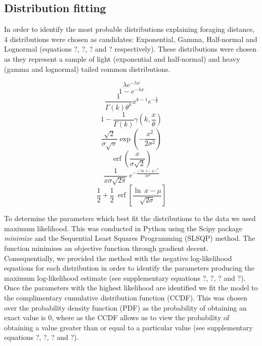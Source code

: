\documentclass[11pt,usenames,dvipsnames,a4paper]{article}
\DeclareMathOperator\erf{erf}
\begin{document}
\subsection{Distribution fitting}

\begin{linenumbers}
\hspace{\parindent}
In order to identify the most probable distributions explaining foraging distance, 4 distributions were chosen as candidates: Exponential, Gamma, Half-normal and Lognormal (equations ?, ?, ? and ? respectively). These distributions were chosen as they represent a sample of light (exponential and half-normal) and heavy (gamma and lognormal) tailed common distributions.
\end{linenumbers}
\begin{equation}
\lambda e^{-\lambda x}
\end{equation}
\begin{equation}
1 - e^{-\lambda x}
\end{equation}
\begin{equation}
\frac{1}{\Gamma(k)\theta^k}x^{k-1}e^{-\frac{x}{\theta}}
\end{equation}
\begin{equation}
1 - \frac{1}{\Gamma(k)}\gamma(k,\frac{x}{\theta})
\end{equation}
\begin{equation}
\frac{\sqrt{2}}{\sigma \sqrt{\pi}} \exp \left(-\frac{x^2}{2 \sigma^2}\right)
\end{equation}
\begin{equation}
\erf\left(\frac{x}{\sigma \sqrt{2}}\right)
\end{equation}
\begin{equation}
\frac{1}{x \sigma \sqrt{2 \pi}}\ e^{- \frac{(\ln\ x - \mu)^2}{2\sigma^2}}
\end{equation}
\begin{equation}
\frac{1}{2} + \frac{1}{2}\ \erf\left[\frac{\ln\ x - \mu}{\sqrt{2 \sigma}}\right]
\end{equation}

\begin{linenumbers}
To determine the parameters which best fit the distributions to the data we used maximum likelihood. This was conducted in Python using the Scipy package \textit{minimize} and the Sequential Least Squares Programming (SLSQP) method. The function minimises an objective function through gradient decent. Consequentially, we provided the method with the negative log-likelihood equations for each distribution in order to identify the parameters producing the maximum log-likelihood estimate (see supplementary equations ?, ?, ? and ?). Once the parameters with the highest likelihood are identified we fit the model to the complimentary cumulative distribution function (CCDF). This was chosen over the probability density function (PDF) as the probability of obtaining an exact value is 0, where as the CCDF allows us to view the probability of obtaining a value greater than or equal to a particular value (see supplementary equations ?, ?, ? and ?). 
\end{linenumbers}
\end{document}
